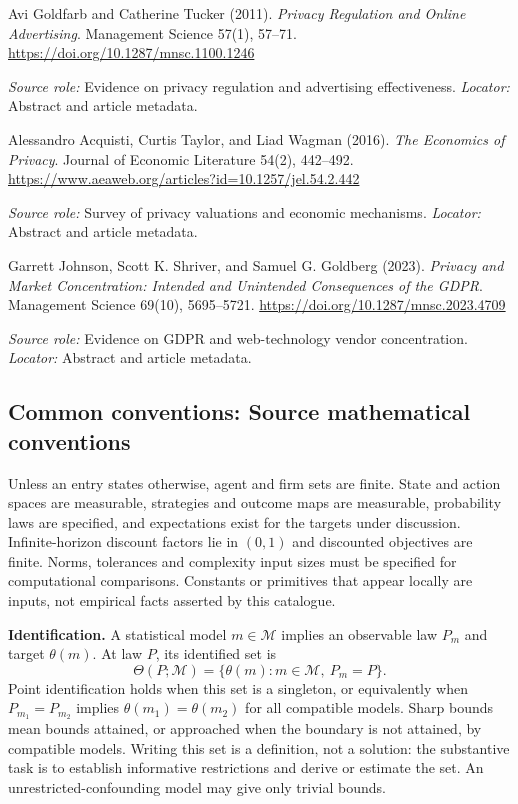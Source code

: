 \documentclass[11pt,a4paper]{article}
\begin{document}
\begin{enumerate}[label={[S\arabic*]},leftmargin=*]

\item Avi Goldfarb and Catherine Tucker (2011). \emph{Privacy Regulation and Online Advertising}. Management Science 57(1), 57--71. \url{https://doi.org/10.1287/mnsc.1100.1246}\par \textit{Source role:} Evidence on privacy regulation and advertising effectiveness. \textit{Locator:} Abstract and article metadata.

\item Alessandro Acquisti, Curtis Taylor, and Liad Wagman (2016). \emph{The Economics of Privacy}. Journal of Economic Literature 54(2), 442--492. \url{https://www.aeaweb.org/articles?id=10.1257/jel.54.2.442}\par \textit{Source role:} Survey of privacy valuations and economic mechanisms. \textit{Locator:} Abstract and article metadata.

\item Garrett Johnson, Scott K. Shriver, and Samuel G. Goldberg (2023). \emph{Privacy and Market Concentration: Intended and Unintended Consequences of the GDPR}. Management Science 69(10), 5695--5721. \url{https://doi.org/10.1287/mnsc.2023.4709}\par \textit{Source role:} Evidence on GDPR and web-technology vendor concentration. \textit{Locator:} Abstract and article metadata.

\end{enumerate}

\subsection*{Common conventions: Source mathematical conventions}

Unless an entry states otherwise, agent and firm sets are finite. State and action spaces are measurable, strategies and outcome maps are measurable, probability laws are specified, and expectations exist for the targets under discussion. Infinite-horizon discount factors lie in $(0,1)$ and discounted objectives are finite. Norms, tolerances and complexity input sizes must be specified for computational comparisons. Constants or primitives that appear locally are inputs, not empirical facts asserted by this catalogue.

\textbf{Identification.} A statistical model $m\in\mathcal M$ implies an observable law $P_m$ and target $\theta(m)$. At law $P$, its identified set is
\[
\Theta(P;\mathcal M)=\{\theta(m):m\in\mathcal M,\ P_m=P\}.
\]
Point identification holds when this set is a singleton, or equivalently when $P_{m_1}=P_{m_2}$ implies $\theta(m_1)=\theta(m_2)$ for all compatible models. Sharp bounds mean bounds attained, or approached when the boundary is not attained, by compatible models. Writing this set is a definition, not a solution: the substantive task is to establish informative restrictions and derive or estimate the set. An unrestricted-confounding model may give only trivial bounds.
\end{document}
